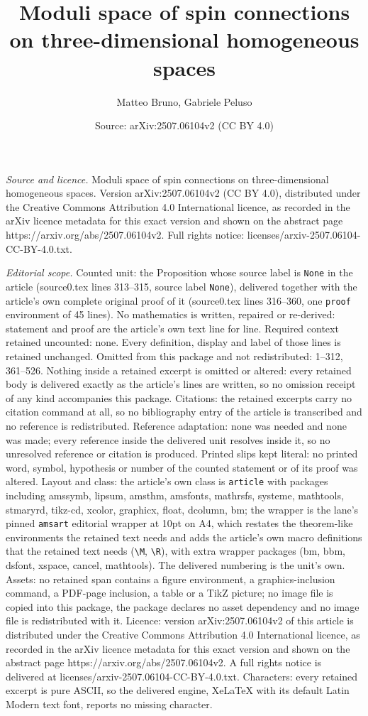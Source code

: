 \documentclass[10pt,a4paper]{amsart}
\title[Moduli space of spin connections on three-dimensional homoge]{Moduli space of spin connections on three-dimensional homogeneous spaces}
\author{Matteo Bruno, Gabriele Peluso}
\date{Source: arXiv:2507.06104v2 (CC BY 4.0)}
\begin{document}
\maketitle

\noindent\emph{Source and licence.} Moduli space of spin connections on three-dimensional homogeneous spaces. Version arXiv:2507.06104v2 (CC BY 4.0), distributed under the Creative Commons Attribution 4.0 International licence, as recorded in the arXiv licence metadata for this exact version and shown on the abstract page https://arxiv.org/abs/2507.06104v2. Full rights notice: licenses/arxiv-2507.06104-CC-BY-4.0.txt.\par\smallskip

\noindent\textit{Editorial scope.} Counted unit: the Proposition whose source label is \texttt{None} in the article (source0.tex lines 313--315, source label \texttt{None}), delivered together with the article's own complete original proof of it (source0.tex lines 316--360, one \texttt{proof} environment of 45 lines). No mathematics is written, repaired or re-derived: statement and proof are the article's own text line for line. Required context retained uncounted: none. Every definition, display and label of those lines is retained unchanged. Omitted from this package and not redistributed: 1--312, 361--526. Nothing inside a retained excerpt is omitted or altered: every retained body is delivered exactly as the article's lines are written, so no omission receipt of any kind accompanies this package. Citations: the retained excerpts carry no citation command at all, so no bibliography entry of the article is transcribed and no reference is redistributed. Reference adaptation: none was needed and none was made; every reference inside the delivered unit resolves inside it, so no unresolved reference or citation is produced. Printed slips kept literal: no printed word, symbol, hypothesis or number of the counted statement or of its proof was altered. Layout and class: the article's own class is \texttt{article} with packages including amssymb, lipsum, amsthm, amsfonts, mathrsfs, systeme, mathtools, stmaryrd, tikz-cd, xcolor, graphicx, float, dcolumn, bm; the wrapper is the lane's pinned \texttt{amsart} editorial wrapper at 10pt on A4, which restates the theorem-like environments the retained text needs and adds the article's own macro definitions that the retained text needs (\texttt{\textbackslash M}, \texttt{\textbackslash R}), with extra wrapper packages (bm, bbm, dsfont, xspace, cancel, mathtools). The delivered numbering is the unit's own. Assets: no retained span contains a figure environment, a graphics-inclusion command, a PDF-page inclusion, a table or a TikZ picture; no image file is copied into this package, the package declares no asset dependency and no image file is redistributed with it. Licence: version arXiv:2507.06104v2 of this article is distributed under the Creative Commons Attribution 4.0 International licence, as recorded in the arXiv licence metadata for this exact version and shown on the abstract page https://arxiv.org/abs/2507.06104v2. A full rights notice is delivered at licenses/arxiv-2507.06104-CC-BY-4.0.txt. Characters: every retained excerpt is pure ASCII, so the delivered engine, XeLaTeX with its default Latin Modern text font, reports no missing character.
\end{document}
